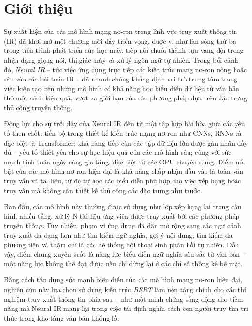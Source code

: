 \section{Giới thiệu}
Sự xuất hiện của các mô hình mạng nơ-ron trong lĩnh vực truy xuất thông tin (IR) đã khơi mở một chương mới đầy triển vọng, được ví như làn sóng thứ ba trong tiến trình phát triển của học máy, tiếp nối chuỗi thành tựu vang dội trong nhận dạng giọng nói, thị giác máy và xử lý ngôn ngữ tự nhiên. Trong bối cảnh đó, \textit{Neural IR} -- tức việc ứng dụng trực tiếp các kiến trúc mạng nơ-ron nông hoặc sâu vào các bài toán IR -- đã nhanh chóng khẳng định vai trò trung tâm trong việc kiến tạo nên những mô hình có khả năng học biểu diễn dữ liệu từ văn bản thô một cách hiệu quả, vượt xa giới hạn của các phương pháp dựa trên đặc trưng thủ công truyền thống.

Động lực cho sự trỗi dậy của Neural IR đến từ một tập hợp hài hòa giữa các yếu tố then chốt: tiến bộ trong thiết kế kiến trúc mạng nơ-ron như CNNs, RNNs và đặc biệt là Transformer; khả năng tiếp cận các tập dữ liệu lớn được gán nhãn đầy đủ -- yếu tố thiết yếu cho sự học hiệu quả của các mô hình sâu; cùng với sức mạnh tính toán ngày càng gia tăng, đặc biệt từ các GPU chuyên dụng. Điểm nổi bật của các mô hình nơ-ron hiện đại là khả năng chấp nhận đầu vào là toàn văn truy vấn và tài liệu, từ đó tự học các biểu diễn phù hợp cho việc xếp hạng hoặc truy vấn mà không cần thiết kế thủ công các đặc trưng như trước.

Ban đầu, các mô hình này thường được sử dụng như lớp xếp hạng lại trong cấu hình nhiều tầng, xử lý N tài liệu ứng viên được truy xuất bởi các phương pháp truyền thống. Tuy nhiên, phạm vi ứng dụng đã dần mở rộng sang các ngữ cảnh truy xuất đa dạng hơn như tìm kiếm ngữ nghĩa, gợi ý nội dung, tìm kiếm đa phương tiện và thậm chí là các hệ thống hội thoại sinh phản hồi tự nhiên. Dẫu vậy, điểm chung xuyên suốt là năng lực biểu diễn ngữ nghĩa sâu sắc từ văn bản -- một năng lực không thể đạt được nếu chỉ dừng lại ở các chỉ số thống kê bề mặt.

Bằng cách tận dụng sức mạnh biểu diễn của các mô hình mạng nơ-ron hiện đại, nghiên cứu này lựa chọn sử dụng kiến trúc \textit{BERT} làm nền tảng chính cho các thí nghiệm truy xuất thông tin phía sau -- như một minh chứng sống động cho tiềm năng mà Neural IR mang lại trong việc tái định nghĩa cách con người truy tìm tri thức trong kho tàng văn bản khổng lồ.
